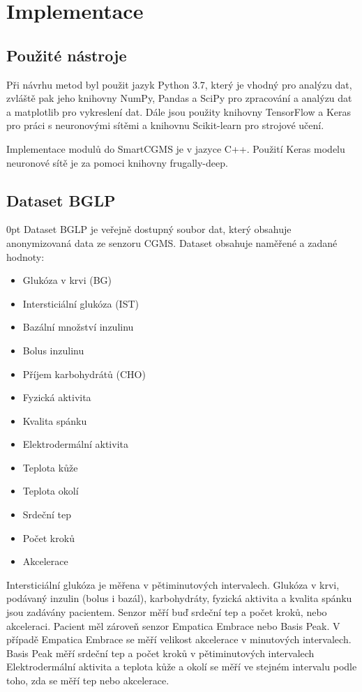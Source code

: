 \chapter{Implementace}

\section{Použité nástroje}

Při návrhu metod byl použit jazyk Python 3.7, který je vhodný pro analýzu dat, zvláště pak jeho knihovny NumPy, Pandas a SciPy pro zpracování a analýzu dat a matplotlib pro vykreslení dat. Dále jsou použity knihovny TensorFlow a Keras pro práci s neuronovými sítěmi a knihovnu Scikit-learn pro strojové učení.

Implementace modulů do SmartCGMS je v jazyce C++. Použití Keras modelu neuronové sítě je za pomoci knihovny frugally-deep\citep{cho.frugally}.

\section{Dataset BGLP}
\label{ch:bglp}

\begin{setlength}{\parskip}{0pt}
Dataset BGLP je veřejně dostupný soubor dat, který obsahuje anonymizovaná data ze senzoru CGMS. Dataset obsahuje naměřené a zadané hodnoty:
\begin{itemize}
\setlength\itemsep{0em}
\item Glukóza v krvi (BG)
\item Intersticiální glukóza (IST)
\item Bazální množství inzulinu
\item Bolus inzulinu
\item Příjem karbohydrátů (CHO)
\item Fyzická aktivita
\item Kvalita spánku
\item Elektrodermální aktivita
\item Teplota kůže
\item Teplota okolí
\item Srdeční tep
\item Počet kroků
\item Akcelerace
\end{itemize}
\end{setlength}

Intersticiální glukóza je měřena v pětiminutových intervalech. Glukóza v krvi, podávaný inzulin (bolus i bazál), karbohydráty, fyzická aktivita a kvalita spánku jsou zadávány pacientem. Senzor měří buď srdeční tep a počet kroků, nebo akceleraci. Pacient měl zároveň senzor Empatica Embrace nebo Basis Peak. V případě Empatica Embrace se měří velikost akcelerace v minutových intervalech.
Basis Peak měří srdeční tep a počet kroků v pětiminutových intervalech Elektrodermální aktivita a teplota kůže a okolí se měří ve stejném intervalu podle toho, zda se měří tep nebo akcelerace.

